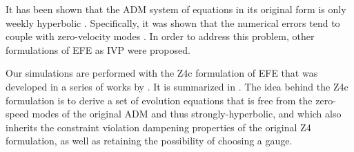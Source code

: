 It has been shown that the \ac{ADM} system of equations in its original form 
is only weekly hyperbolic \citep{Baumgarte:2002jm}. 
Specifically, it was shown that 
the numerical errors tend to couple with zero-velocity modes \citep{Alcubierre:1999rt}. 
In order to address this problem, other formulations of \ac{EFE} as \ac{IVP} 
were proposed. 



Our simulations are performed with the Z4c formulation of \ac{EFE} 
that was developed in a series of works by 
\citet{Bernuzzi:2009ex,Ruiz:2010qj,Weyhausen:2011cg,Cao:2011fu,Hilditch:2012fp}. 
It is summarized in \citet{Hilditch:2012fp}. 
%
The idea behind the Z4c formulation is to derive a set of evolution equations that is 
free from the zero-speed modes of the original \ac{ADM} and thus strongly-hyperbolic, and which also inherits the constraint violation dampening properties 
of the original Z4 formulation, as well as retaining the possibility of choosing a gauge.


